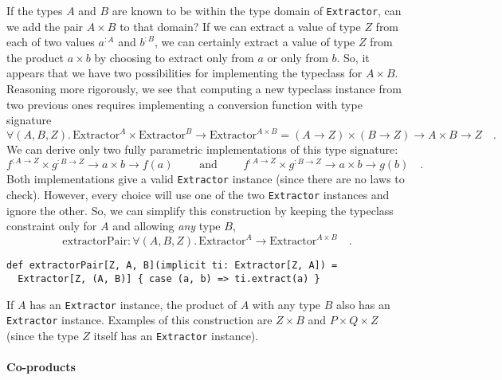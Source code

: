 If the types $A$ and $B$ are known to be within the type domain
of \lstinline!Extractor!, can we add the pair $A\times B$ to that
domain? If we can extract a value of type $Z$ from each of two values
$a^{:A}$ and $b^{:B}$, we can certainly extract a value of type
$Z$ from the product $a\times b$ by choosing to extract only from
$a$ or only from $b$. So, it appears that we have two possibilities
for implementing the typeclass for $A\times B$. Reasoning more rigorously,
we see that computing a new typeclass instance from two previous ones
requires implementing a conversion function with type signature
\[
\forall(A,B,Z).\,\text{Extractor}^{A}\times\text{Extractor}^{B}\rightarrow\text{Extractor}^{A\times B}=\left(A\rightarrow Z\right)\times\left(B\rightarrow Z\right)\rightarrow A\times B\rightarrow Z\quad.
\]
We can derive only two fully parametric implementations of this type
signature: 
\[
f^{:A\rightarrow Z}\times g^{:B\rightarrow Z}\rightarrow a\times b\rightarrow f(a)\quad\quad\text{ and }\quad\quad f^{:A\rightarrow Z}\times g^{:B\rightarrow Z}\rightarrow a\times b\rightarrow g(b)\quad.
\]
Both implementations give a valid \lstinline!Extractor! instance
(since there are no laws to check). However, every choice will use
one of the two \lstinline!Extractor! instances and ignore the other.
So, we can simplify this construction by keeping the typeclass constraint
only for $A$ and allowing \emph{any} type $B$,
\[
\text{extractorPair}:\forall(A,B,Z).\,\text{Extractor}^{A}\rightarrow\text{Extractor}^{A\times B}\quad.
\]
\begin{lstlisting}
def extractorPair[Z, A, B](implicit ti: Extractor[Z, A]) =
  Extractor[Z, (A, B)] { case (a, b) => ti.extract(a) }
\end{lstlisting}
If $A$ has an \lstinline!Extractor! instance, the product of $A$
with any type $B$ also has an \lstinline!Extractor! instance. Examples
of this construction are $Z\times B$ and $P\times Q\times Z$ (since
the type $Z$ itself has an \lstinline!Extractor! instance).

\paragraph{Co-products}

